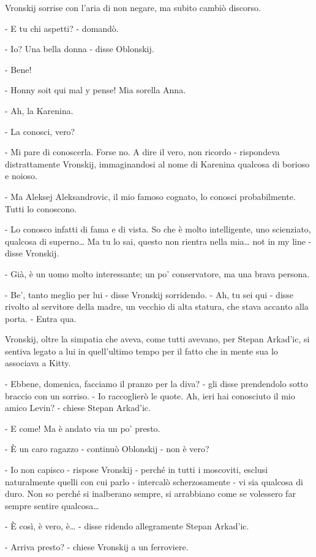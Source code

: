 Vronskij sorrise con l'aria di non negare, ma subito cambiò discorso. 

- E tu chi aspetti? - domandò. 

- Io? Una bella donna - disse Oblonskij. 

- Bene! 

- Honny soit qui mal y pense! Mia sorella Anna. 

- Ah, la Karenina. 

- La conosci, vero? 

- Mi pare di conoscerla. Forse no. A dire il vero, non ricordo - rispondeva distrattamente Vronskij, immaginandosi al nome di Karenina qualcosa di borioso e noioso. 

- Ma Aleksej Aleksandrovic, il mio famoso cognato, lo conosci probabilmente. Tutti lo conoscono. 

- Lo conosco infatti di fama e di vista. So che è molto intelligente, uno scienziato, qualcosa di superno\ldots{} Ma tu lo sai, questo non rientra nella mia\ldots{} not in my line - disse Vronskij. 

- Già, è un uomo molto interessante; un po' conservatore, ma una brava persona. 

- Be', tanto meglio per lui - disse Vronskij sorridendo. - Ah, tu sei qui - disse rivolto al servitore della madre, un vecchio di alta statura, che stava accanto alla porta. - Entra qua. 

Vronskij, oltre la simpatia che aveva, come tutti avevano, per Stepan Arkad'ic, si sentiva legato a lui in quell'ultimo tempo per il fatto che in mente sua lo associava a Kitty. 

- Ebbene, domenica, facciamo il pranzo per la diva? - gli disse prendendolo sotto braccio con un sorriso. - Io raccoglierò le quote. Ah, ieri hai conosciuto il mio amico Levin? - chiese Stepan Arkad'ic. 

- E come! Ma è andato via un po' presto. 

- È un caro ragazzo - continuò Oblonskij - non è vero? 

- Io non capisco - rispose Vronskij - perché in tutti i moscoviti, esclusi naturalmente quelli con cui parlo - intercalò scherzosamente - vi sia qualcosa di duro. Non so perché si inalberano sempre, si arrabbiano come se volessero far sempre sentire qualcosa\ldots{} 

- È così, è vero, è\ldots{} - disse ridendo allegramente Stepan Arkad'ic. 

- Arriva presto? - chiese Vronskij a un ferroviere. 

